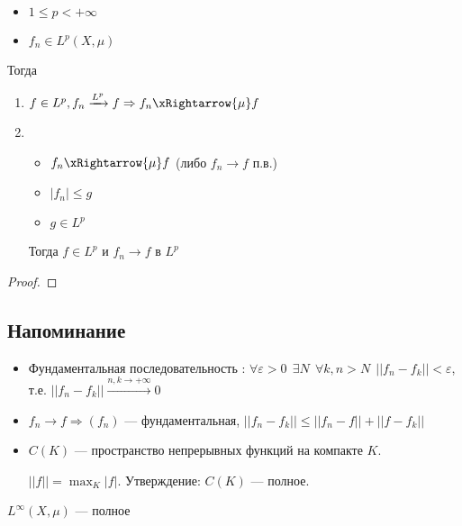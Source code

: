 \begin{theorem}\itemfix
    \begin{itemize}
        \item \(1 \leq p < +\infty\)
        \item \(f_n \in L^p(X, \mu)\)
    \end{itemize}
    Тогда
    \begin{enumerate}
        \item \(f \in L^p, f_n \xrightarrow{L^p} f \Rightarrow f_n \xRightarrow{\mu} f\)
        \item \begin{itemize}
        	  	\item \(f_n \xRightarrow{\mu} f\) (либо \(f_n \to f\) п.в.)
        	  	\item \(|f_n| \leq g\)
        	  	\item \(g \in L^p\)
        	  \end{itemize}
        	  Тогда \(f \in L^p\) и \(f_n \to f\) в \(L^p\)
    \end{enumerate}
\end{theorem}
\begin{proof}
	\unfinished %
\end{proof}

\subsection{Напоминание}

\begin{itemize}
    \item Фундаментальная последовательность : \(\forall \varepsilon > 0 \ \ \exists N \ \ \forall k, n > N \ \ ||f_n - f_k|| < \varepsilon\), т.е. \(||f_n - f_k|| \xrightarrow{n,k \to +\infty} 0\)
    \item \(f_n \to f \Rightarrow  (f_n)\) --- фундаментальная, \(||f_n - f_k|| \leq  ||f_n - f|| + ||f - f_k||\)
    \item \(C(K)\) --- пространство непрерывных функций на компакте \(K\).

          \(||f|| = \max_K |f|\). Утверждение: \(C(K)\) --- полное.
\end{itemize}

\begin{exercise}
    \(L^{\infty}(X, \mu)\) --- полное %
\end{exercise}

